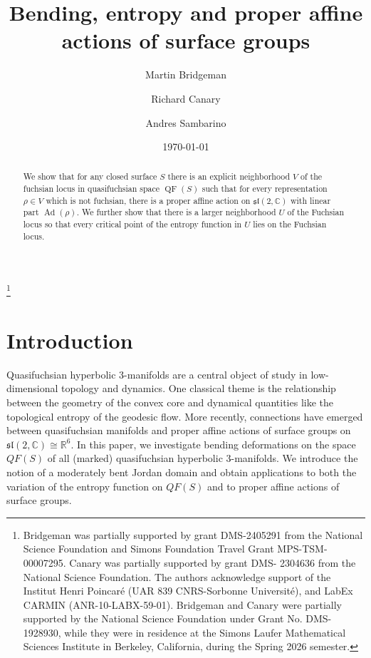 \documentclass{amsart}
\theoremstyle{plain}
\theoremstyle{definition}
\theoremstyle{remark}
\newcommand{\CC}{\mathbb C}
\newcommand{\Ad}{\operatorname{Ad}}
\newcommand{\QF}{\operatorname{QF}}
\newcommand{\C}{\mathbb C}
\renewcommand{\sl}{\mathfrak{sl}}
\newcommand{\<}{\left <}
\renewcommand{\>}{\right >}
\renewcommand{\C}{\mathbb C}
\begin{document}
\title[Bending, entropy and proper affine actions]{Bending, entropy and proper affine actions of surface groups}
\author[Bridgeman]{Martin Bridgeman}
\address{Boston College}
\author[Canary]{Richard Canary}
\address{University of Michigan}
\author[Sambarino]{Andres Sambarino}
\address{CNRS - Universit\'e Sorbonne Paris Nord}
\thanks{Bridgeman was partially supported by grant DMS-2405291 from the National Science Foundation and Simons Foundation Travel Grant MPS-TSM-00007295.
Canary was partially supported by grant  DMS- 2304636 from the National Science Foundation. The authors acknowledge support of the Institut Henri Poincar\'e 
(UAR 839 CNRS-Sorbonne Université), and LabEx CARMIN (ANR-10-LABX-59-01).
Bridgeman and Canary were partially supported by the National Science Foundation
under Grant No. DMS-1928930, while they were in residence at the Simons Laufer Mathematical Sciences Institute in Berkeley, California, during the Spring 2026 semester.}

\date{\today}


\begin{abstract} 
We show that for any closed surface $S$ there is an explicit neighborhood $V$ of the fuchsian locus in quasifuchsian space $\QF(S)$ such that for every representation 
$\rho\in V$ which is not
fuchsian,   there is a proper affine action on $\mathfrak{sl}(2,\CC)$ with linear part $\Ad(\rho)$. We further show that there is a larger neighborhood  
$U$ of the Fuchsian locus so that every
critical point of the entropy function in $U$ lies on the Fuchsian locus.
\end{abstract}

\maketitle

\setcounter{tocdepth}{1}
\tableofcontents

\section{Introduction}


Quasifuchsian hyperbolic 3-manifolds are a central object of study in low-dimensional topology and dynamics. One classical theme 
is the relationship between the geometry of the convex core and dynamical quantities like the topological entropy of the geodesic flow.
More recently, connections 
have emerged between quasifuchsian manifolds and proper affine actions of surface groups on $\sl(2,\C)\cong\mathbb R^6$.
In this paper, we investigate  bending deformations on the space $QF(S)$ of all (marked) quasifuchsian hyperbolic 3-manifolds.
We introduce the notion of a moderately bent Jordan domain and obtain applications to both the variation of the entropy function on $QF(S)$
and to proper affine actions of surface groups.
\end{document}
